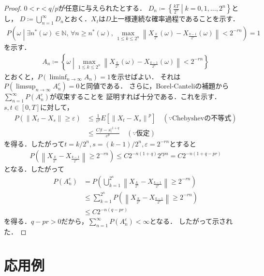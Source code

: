 \documentclass[dvipdfmx,autodetect-engine]{jsarticle}
\theoremstyle{remark}
\theoremstyle{definition}
\newcommand{\N}{\mathbb{N}}
\newcommand{\abs}[1]{\left\lvert#1\right\rvert}
\newcommand{\norm}[1]{\left\lVert#1\right\rVert}
\newcommand{\setmid}{\mathrel{} \middle| \mathrel{}}
\begin{document}
\begin{proof}
    $0<r<q/p$が任意に与えられたとする．
    $D_{n} \coloneqq \left\{\frac{kT}{2^n} \setmid k=0,1,\ldots,2^{n}\right\}$とし，
    $D \coloneqq \bigcup_{n=1}^{\infty} D_n$とおく．$X_{t}$は$D$上一様連続な確率過程であることを示す．
    \begin{align}
        P\left(\omega \setmid 
        \exists n^{*}(\omega)\in \N,\,\forall n \geq n^{*}(\omega),\,
        \max_{1\leq k\leq 2^{n}} \norm{X_{\frac{k}{2^n}}(\omega) - X_{\frac{k-1}{2^n}}(\omega)}
        < 2^{-rn}\right) = 1
    \end{align}
    を示す．
    \begin{align}
        A_{n} \coloneqq \left\{ \omega \setmid 
        \max_{1\leq k\leq 2^n} \norm{X_{\frac{k}{2^n}}(\omega) - 
        X_{\frac{k-1}{2^n}}(\omega)} < 2^{-rn}\right\}
    \end{align}
    とおくと，$P(\liminf_{n\to\infty} A_{n})=1$を示せばよい．
    それは$P(\limsup_{n\to\infty}A_{n}^{c})=0$と同値である．
    さらに，Borel-Canteliの補題から$\sum_{n=1}^{\infty}P(A_{n}^{c})$が収束することを
    証明すれば十分である．これを示す．
    $s,t \in [0,T]$に対して，
    \begin{align}
        P(\norm{X_{t} - X_{s}} \geq \varepsilon) 
        &\leq \frac{1}{\varepsilon^{p}} E[\norm{X_{t} - X_{s}}^{p}] 
        \quad (\because \text{Chebyshevの不等式})\\
        &\leq  \frac{C\abs{t-s}^{1+q}}{\varepsilon^{p}} \quad (\because \text{仮定})
    \end{align}
    を得る．したがって$t=k/2^{n},s=(k-1)/2^{n},\varepsilon = 2^{-rn}$とすると
    \begin{align}
        P\left(\norm{ X_{\frac{k}{2^{n}}} - X_{\frac{k-1}{2^{n}}} } \geq 2^{-rn}\right)
        \leq C 2^{-n(1+q)}2^{rpn} = C 2^{-n(1+q-pr)}
    \end{align}
    となる．したがって
    \begin{align}
        P(A_{n}^{c}) &= P\left( \bigcup_{k=1}^{2^{n}} 
        \norm{ X_{\frac{k}{2^{n}}} - X_{\frac{k-1}{2^{n}}} } \geq 2^{-rn} \right)\\
        &\leq \sum_{k=1}^{2^{n}} P\left(
            \norm{ X_{\frac{k}{2^{n}}} - X_{\frac{k-1}{2^{n}}} } \geq 2^{-rn}
         \right)\\
         &\leq C2^{-n(q-pr)}
    \end{align}
    を得る．$q-pr>0$だから，$\sum_{n=1}^{\infty} P(A_{n}^{c}) < \infty$となる．
    したがって示された．
\end{proof}

\section{応用例}
\end{document}

